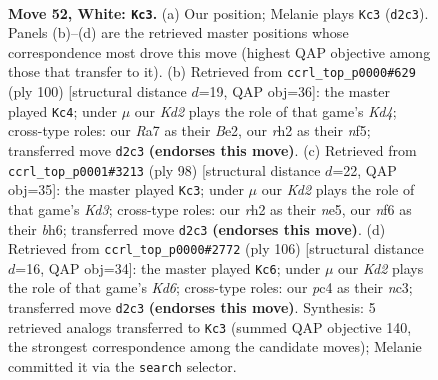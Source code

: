 \documentclass[11pt]{article}
\begin{document}
\clearpage

\begin{figure}[p]\centering
\begin{subfigure}{0.46\textwidth}\centering
\resizebox{\linewidth}{!}{%
\newchessgame
\chessboard[
  setfen={8/R7/5nk1/1P1P4/p1p3P1/8/1P1K3r/8 w - - 15 52},
  showmover=false,
  pgfstyle=straightmove, color=movearrow, markmove={d2-c3}
]}
\caption{}
\end{subfigure}\hfill
\begin{subfigure}{0.46\textwidth}\centering
\resizebox{\linewidth}{!}{%
\newchessgame
\chessboard[
  setfen={8/p7/8/5nkp/1p1K4/6P1/PP2B3/8 w - - 10 51},
  showmover=false,
  pgfstyle=straightmove, color=movearrow, markmove={d4-c4}
]}
\caption{}
\end{subfigure}
\\[4pt]
\begin{subfigure}{0.46\textwidth}\centering
\resizebox{\linewidth}{!}{%
\newchessgame
\chessboard[
  setfen={8/8/1p2k2b/4n3/6PP/1p1K4/1P6/3R4 w - - 2 50},
  showmover=false,
  pgfstyle=straightmove, color=movearrow, markmove={d3-c3}
]}
\caption{}
\end{subfigure}\hfill
\begin{subfigure}{0.46\textwidth}\centering
\resizebox{\linewidth}{!}{%
\newchessgame
\chessboard[
  setfen={5k2/1R5p/3K2p1/1P4P1/3r4/2n5/P7/8 w - - 1 54},
  showmover=false,
  pgfstyle=straightmove, color=movearrow, markmove={d6-c6}
]}
\caption{}
\end{subfigure}
\caption{\textbf{Move 52, White: \texttt{Kc3}.} (a) Our position; Melanie plays \texttt{Kc3} (\texttt{d2c3}). Panels (b)--(d) are the retrieved master positions whose correspondence most drove this move (highest QAP objective among those that transfer to it). (b) Retrieved from \texttt{ccrl\_top\_p0000\#629} (ply 100) [structural distance $d$=19, QAP obj=36]: the master played \texttt{Kc4}; under $\mu$ our \emph{Kd2} plays the role of that game's \emph{Kd4}; cross-type roles: our \emph{R}a7 as their \emph{B}e2, our \emph{r}h2 as their \emph{n}f5; transferred move \texttt{d2c3} \textbf{(endorses this move)}. (c) Retrieved from \texttt{ccrl\_top\_p0001\#3213} (ply 98) [structural distance $d$=22, QAP obj=35]: the master played \texttt{Kc3}; under $\mu$ our \emph{Kd2} plays the role of that game's \emph{Kd3}; cross-type roles: our \emph{r}h2 as their \emph{n}e5, our \emph{n}f6 as their \emph{b}h6; transferred move \texttt{d2c3} \textbf{(endorses this move)}. (d) Retrieved from \texttt{ccrl\_top\_p0000\#2772} (ply 106) [structural distance $d$=16, QAP obj=34]: the master played \texttt{Kc6}; under $\mu$ our \emph{Kd2} plays the role of that game's \emph{Kd6}; cross-type roles: our \emph{p}c4 as their \emph{n}c3; transferred move \texttt{d2c3} \textbf{(endorses this move)}. Synthesis: 5 retrieved analogs transferred to \texttt{Kc3} (summed QAP objective 140, the strongest correspondence among the candidate moves); Melanie committed it via the \texttt{search} selector.}
\label{fig:thought-m102}
\end{figure}
\end{document}
